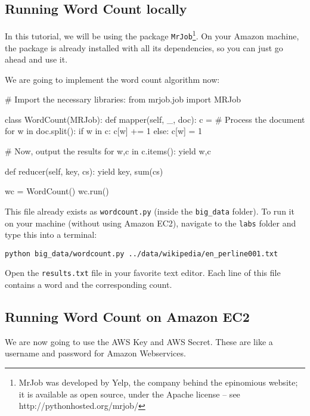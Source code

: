 \subsection{Running Word Count locally}

In this tutorial, we will be using the package \texttt{MrJob}\footnote{MrJob was developed by Yelp, the company behind the epinomious website; it is available
as open source, under the Apache license -- see http://pythonhosted.org/mrjob/}. On your Amazon machine, the package
is already installed with all its dependencies, so you can just go ahead and
use it.

We are going to implement the word count algorithm now:

\begin{python}
# Import the necessary libraries:
from mrjob.job import MRJob

class WordCount(MRJob):
    def mapper(self, _, doc):
        c = {}
        # Process the document
        for w in doc.split():
            if w in c:
                c[w] += 1
            else:
                c[w] = 1

        # Now, output the results
        for w,c in c.items():
            yield w,c

    def reducer(self, key, cs):
        yield key, sum(cs)

wc = WordCount()
wc.run()
\end{python}

This file already exists as \texttt{wordcount.py} (inside the \texttt{big\_data} folder). To run it on your machine (without using Amazon EC2), navigate to the \texttt{labs} folder and type this into a terminal:

\begin{verbatim}
python big_data/wordcount.py ../data/wikipedia/en_perline001.txt
\end{verbatim}

Open the \texttt{results.txt} file in your favorite text editor. Each line of this file contains a word and the corresponding count.

\subsection{Running Word Count on Amazon EC2}

We are now going to use the AWS Key and AWS Secret. These are like a username
and password for Amazon Webservices.


